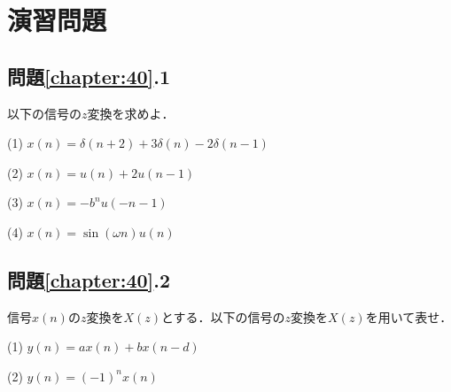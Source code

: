 \newpage

\section*{演習問題}

\subsection*{問題\ref{chapter:40}.1}

以下の信号の$z$変換を求めよ．

(1) $x(n)=\delta(n+2)+3\delta(n)-2\delta(n-1)$

(2) $x(n)=u(n)+2u(n-1)$

(3) $x(n)=-b^nu(-n-1)$

(4) $x(n)=\sin(\omega n)u(n)$

\subsection*{問題\ref{chapter:40}.2}

信号$x(n)$の$z$変換を$X(z)$とする．以下の信号の$z$変換を$X(z)$を用いて表せ．

(1) $y(n)=ax(n)+bx(n-d)$

(2) $y(n)=(-1)^nx(n)$


